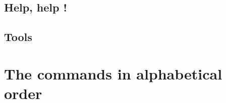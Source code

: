 \documentclass[12pt,a4paper]{article}
\begin{document}



\subsection{Help, help !}



\subsection{Tools}





\clearpage

\section{The commands in alphabetical order}
\label{sec:ComAlpOrd}






\end{document}
